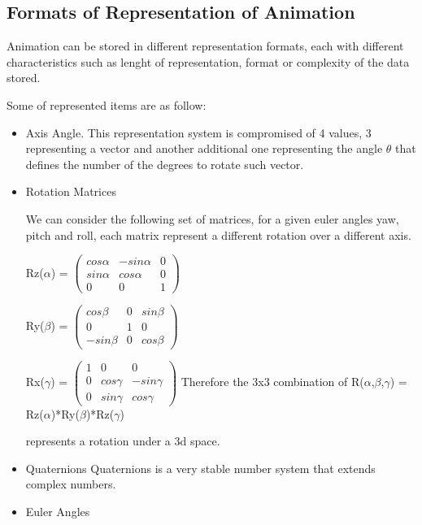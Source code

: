 \subsection{Formats of Representation of Animation} \label{subsec:AnimationRepresentationFormats}

Animation can be stored in different representation formats, each with different characteristics such as lenght of representation,  format or complexity of the data stored.

Some of represented items are as follow:

\begin{itemize} 
	\item  Axis Angle.
	This representation system is compromised of 4 values, 3 representing a vector and another additional one representing 
	the angle $\theta$ that defines the number of the degrees to rotate such vector.
	\item  Rotation Matrices
	
	We can consider the following set of matrices, for a given euler angles yaw, pitch and roll, each matrix
	represent a different rotation over a different axis.
	
	Rz($\alpha$) = 
	$\begin{pmatrix} 
	cos \alpha & -sin \alpha & 0 \\ 
	sin \alpha & cos \alpha & 0 \\ 
	0 & 0 & 1  
	\end{pmatrix} $
		
	Ry($\beta$) = 
	$\begin{pmatrix} 
	cos \beta & 0 & sin \beta \\ 
	0 & 1 & 0 \\ 
	-sin \beta & 0 & cos \beta  
	\end{pmatrix} $
	
	Rx($\gamma$) = 
	$\begin{pmatrix} 
	1 & 0 & 0 \\ 
	0 & cos \gamma & -sin \gamma \\ 
	0 & sin \gamma & cos \gamma  
	\end{pmatrix} $ 
	\bigbreak \bigbreak 
	Therefore the 3x3 combination of
	R($\alpha$,$\beta$,$\gamma$) = Rz($\alpha$)*Ry($\beta$)*Rz($\gamma$)
	
	represents a rotation under a 3d space.
	
	\item  Quaternions
	Quaternions is a very stable number system that extends complex numbers.
	
	\item  Euler Angles
	
\end{itemize}
